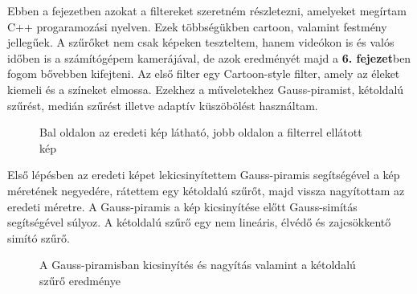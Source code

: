 
Ebben a fejezetben azokat a filtereket szeretném részletezni, amelyeket megírtam C++ progaramozási nyelven. Ezek többségükben cartoon, valamint festmény jellegűek. A szűrőket nem csak képeken teszteltem, hanem videókon is és valós időben is a számítógépem kamerájával, de azok eredményét majd a \textbf{6. fejezet}ben fogom bővebben kifejteni.
Az első filter egy Cartoon-style filter, amely az éleket kiemeli és a színeket elmossa. Ezekhez a műveletekhez Gauss-piramist, kétoldalú szűrést, medián szűrést illetve adaptív küszöbölést használtam.
\begin{figure}[ht]
\centering
{}
\caption{Bal oldalon az eredeti kép látható, jobb oldalon a filterrel ellátott kép} 
\label{fig: cartoon1}
\end{figure}
Első lépésben az eredeti képet lekicsinyítettem Gauss-piramis segítségével a kép méretének negyedére, rátettem egy kétoldalú szűrőt, majd vissza nagyítottam az eredeti méretre. A Gauss-piramis a kép kicsinyítése előtt Gauss-simítás segítségével súlyoz. A kétoldalú szűrő egy nem lineáris, élvédő és zajcsökkentő simító szűrő.
\begin{figure}[ht]
\centering
{}
\caption{A Gauss-piramisban kicsinyítés és nagyítás valamint a kétoldalú szűrő eredménye } 
\label{fig: cartoon2}
\end{figure}

